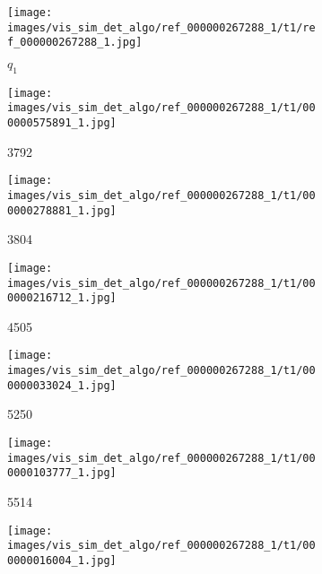 \begin{figure}[h!]
     \centering
     \begin{subfigure}[b]{0.09\textwidth}
         \centering
         \texttt{[image: images/vis\_sim\_det\_algo/ref\_000000267288\_1/t1/ref\_000000267288\_1.jpg]}
         \caption*{$q_1$}
         \label{fig:vis_sim_img_ex_1_1}
     \end{subfigure}  
     \begin{subfigure}[b]{0.09\textwidth}
         \centering
         \texttt{[image: images/vis\_sim\_det\_algo/ref\_000000267288\_1/t1/000000575891\_1.jpg]}
         \caption*{3792}
         \label{fig:vis_sim_img_ex_1_2}
     \end{subfigure}  
     \hfill
     \begin{subfigure}[b]{0.09\textwidth}
         \centering
         \texttt{[image: images/vis\_sim\_det\_algo/ref\_000000267288\_1/t1/000000278881\_1.jpg]}
         \caption*{3804}
         \label{fig:vis_sim_img_ex_1_3}
     \end{subfigure}  
     \hfill
     \begin{subfigure}[b]{0.09\textwidth}
         \centering
         \texttt{[image: images/vis\_sim\_det\_algo/ref\_000000267288\_1/t1/000000216712\_1.jpg]}
         \caption*{4505}         
         \label{fig:vis_sim_img_ex_1_4}
     \end{subfigure}  
     \hfill
     \begin{subfigure}[b]{0.09\textwidth}
         \centering
         \texttt{[image: images/vis\_sim\_det\_algo/ref\_000000267288\_1/t1/000000033024\_1.jpg]}
         \caption*{5250}         
         \label{fig:vis_sim_img_ex_1_5}
     \end{subfigure}  
     \hfill
     \begin{subfigure}[b]{0.09\textwidth}
         \centering
         \texttt{[image: images/vis\_sim\_det\_algo/ref\_000000267288\_1/t1/000000103777\_1.jpg]}
         \caption*{5514}         
         \label{fig:vis_sim_img_ex_1_6}
     \end{subfigure}  
     \hfill
     \begin{subfigure}[b]{0.09\textwidth}
         \centering
         \texttt{[image: images/vis\_sim\_det\_algo/ref\_000000267288\_1/t1/000000016004\_1.jpg]}

\end{subfigure}
\end{figure}
